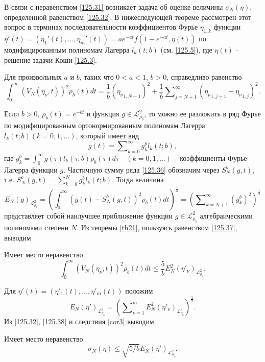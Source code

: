 В связи с неравенством \eqref{125.31} возникает задача об оценке величины $\sigma_N(\eta)$, определенной равенством \eqref{125.32}. В нижеследующей теореме рассмотрен этот вопрос в терминах
последовательности  коэффициентов Фурье $\eta_{1,k}$ функции
$\eta'(t)=(\eta_1'(t),\ldots,\eta_m'(t))=ae^{-at}f(1-e^{-at},\eta(t))$ по модифицированным полиномам Лагерра $l_k(t;b)$ (см. \eqref{125.5}), где $\eta(t)$ -- решение задачи Коши \eqref{125.3}.
\begin{theorem}\label{th21}
	Для произвольных $a$ и $b$, таких что $0<a<1$, $b>0$, справедливо равенство
	\begin{equation}\label{125.33}
	\int_{0}^{\infty}(V_N(\eta_\nu,t))^2\rho_b(t)dt=
	\frac1{b}\left({\eta_\nu}_{1,N+1}\right)^2+
	\frac1{b}\sum\nolimits_{j=N+1}^\infty  ({\eta_\nu}_{1,j+1}-{\eta_\nu}_{1,j})^2.
	\end{equation}
	
\end{theorem}

Если $b>0$, $\rho_b(t)=e^{-bt}$ и функция $g\in \mathcal{L}_{\rho_b}^2$, то можно ее разложить в ряд Фурье по модифицированным ортонормированным полиномам Лагерра $l_{k}(t;b) (k=0,1,\ldots)$, который имеет вид
\begin{equation}\label{125.36}
g(t)=\sum\nolimits_{k=0}^{\infty}g_k^bl_{k}(t;b),
\end{equation}
где $g_k^b=\int_{0}^{\infty}g(\tau)l_{k}(\tau;b)\rho_b(\tau)d\tau \quad (k=0,1,\ldots)$ -- коэффициенты Фурье-Лагерра функции $g$. Частичную сумму ряда \eqref{125.36} обозначим через $S_N^b(g,t)$, т.е. $S_N^b(g,t)=\sum_{k=0}^Ng_k^bl_{k}(t;b)$. Тогда величина
\begin{equation}\label{125.37}
E_N(g)_{\mathcal{L}_{\rho_b}^2}=\left(\int_{0}^{\infty} (g(t)-S_N^b(g,t))^2\rho_b(t)dt\right)^\frac12=\left(\sum\nolimits_{k=N+1}^{\infty}(g_k^b)^2\right)^\frac12
\end{equation}
представляет собой наилучшее приближение функции $g\in \mathcal{L}_{\rho_b}^2$ алгебраическими полиномами степени $N$. Из теоремы \ref{th21}, пользуясь равенством \eqref{125.37}, выводим
\begin{corollary}\label{cor3} Имеет место неравенство
	$$
	\int_{0}^{\infty}(V_N(\eta_\nu,t))^2\rho_b(t)dt\le \frac5bE^2_N(\eta'_\nu)_{\mathcal{L}_{\rho_b}^2}.
	$$
\end{corollary}
Для $\eta'(t)=(\eta'_1(t),\ldots,\eta'_m(t))$ положим
\begin{equation}\label{125.38}
E_N(\eta')_{\mathcal{L}_{\rho_b}^2}=\left(\sum\nolimits_{\nu=1}^{m}E^2_N(\eta'_\nu)_{\mathcal{L}_{\rho_b}^2}\right)^\frac12.
\end{equation}
Из \eqref{125.32}, \eqref{125.38} и следствия \ref{cor3} выводим
\begin{corollary}\label{cor11} Имеет место неравенство
	$$
	\sigma_N(\eta)\le  \sqrt{5/b}E_N(\eta')_{\mathcal{L}_{\rho_b}^2}.
	$$
\end{corollary}

